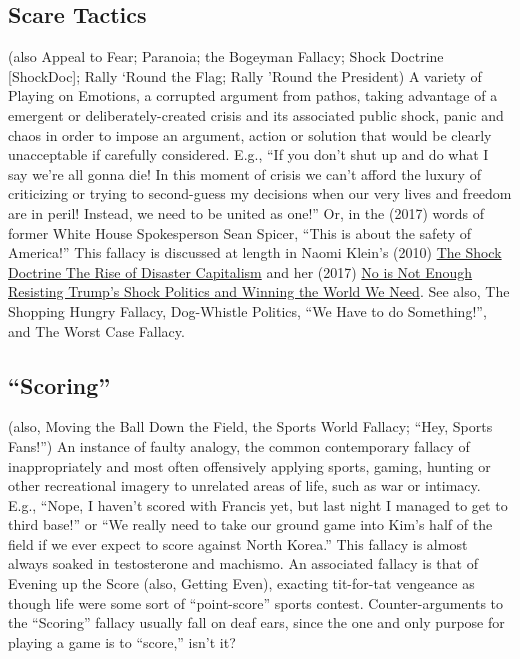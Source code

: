 \documentclass[10pt,a4paper,british]{article}
\begin{document}
\begin{multicols}{2}
	\subsection{Scare Tactics} (also Appeal to Fear; Paranoia; the Bogeyman Fallacy; Shock Doctrine [ShockDoc]; Rally `Round the Flag; Rally 'Round the President) A variety of Playing on Emotions, a corrupted argument from pathos, taking advantage of a emergent or deliberately{-}created crisis and its associated public shock, panic and chaos in order to impose an argument, action or solution that would be clearly unacceptable if carefully considered. E.g., ``If you don't shut up and do what I say we're all gonna die! In this moment of crisis we can't afford the luxury of criticizing or trying to second{-}guess my decisions when our very lives and freedom are in peril!  Instead, we need to be united as one!'' Or, in the (2017) words of former White House Spokesperson Sean Spicer, ``This is about the safety of America!'' This fallacy is discussed at length in Naomi Klein's (2010) \href{https://www.amazon.com/Shock-Doctrine-Rise-Disaster-Capitalism/dp/080507983}{The Shock Doctrine The Rise of Disaster Capitalism} and her (2017) \href{https://www.amazon.com/No-Not-Enough-Resisting-Politics/dp/1608468909}{No is Not Enough Resisting Trump's Shock Politics and Winning the World We Need}. See also, The Shopping Hungry Fallacy, Dog{-}Whistle Politics, ``We Have to do Something!'', and The Worst Case Fallacy.  

    \subsection{``Scoring''} (also, Moving the Ball Down the Field, the Sports World Fallacy; ``Hey, Sports Fans!'') An instance of faulty analogy, the common contemporary fallacy of inappropriately and most often offensively applying sports, gaming, hunting or other recreational imagery to unrelated areas of life, such as war or intimacy. E.g., ``Nope, I haven't scored with Francis yet, but last night I managed to get to third base!''  or ``We really need to take our ground game into Kim's half of the field if we ever expect to score against North Korea.'' This fallacy is almost always soaked in testosterone and machismo. An associated fallacy is that of Evening up the Score (also, Getting Even), exacting tit{-}for{-}tat vengeance as though life were some sort of ``point{-}score'' sports contest.  Counter{-}arguments to the ``Scoring'' fallacy usually fall on deaf ears, since the one and only purpose for playing a game is to ``score,'' isn't it?  


\end{multicols}
\end{document}
